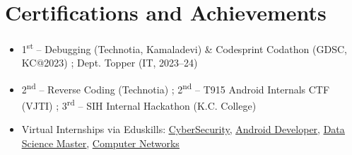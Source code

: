 \documentclass[a4paper,11pt]{article}
\newcommand{\resumeItem}[1]{
  \item\small{#1}
}
\newcommand{\resumeItemListStart}{\begin{itemize}[rightmargin=0.11in]}
\newcommand{\resumeItemListEnd}{\end{itemize}}
\begin{document}



\section{Certifications and Achievements}
\resumeItemListStart{}
  \resumeItem{1\textsuperscript{st} – Debugging (Technotia, Kamaladevi) \& Codesprint Codathon (GDSC, KC@2023) ; Dept. Topper (IT, 2023–24)} 
  \resumeItem{2\textsuperscript{nd} – Reverse Coding (Technotia) ; 2\textsuperscript{nd} – T915 Android Internals CTF (VJTI) ; 3\textsuperscript{rd} – SIH Internal Hackathon (K.C. College)}
  \resumeItem{Virtual Internships via Eduskills: \href{https://aictecert.eduskillsfoundation.org/pages/home/verify.php?cert=302f1886823167c7ef0ef578223c072f}{\uline{CyberSecurity}}, \href{https://aictecert.eduskillsfoundation.org/pages/home/verify.php?cert=9d7218a4a5c5ededd2b49dfc987bbf61}{\uline{Android Developer}}, \href{https://aictecert.eduskillsfoundation.org/pages/home/verify.php?cert=13bcb2d0ecf9d2b4c0cfd2e236300456}{\uline{Data Science Master}}, \href{https://aictecert.eduskillsfoundation.org/pages/home/verify.php?cert=cfae1e9e1eecb2a6b907475e90b5e31f}{\uline{Computer Networks}}}

\resumeItemListEnd{}

\end{document}
